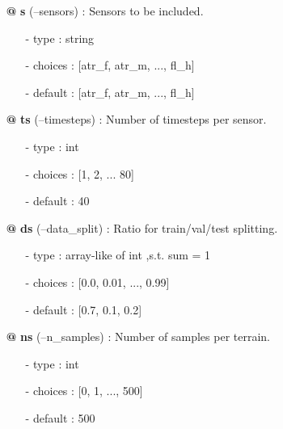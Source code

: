 {\begin{minipage}{\textwidth}
\begin{tcolorbox}[boxsep=0pt,top=10pt,left=10pt,right=10pt, bottom=10pt, arc=0pt, auto outer arc, colback=white, colframe=lightgray]
\begin{itemize}
\item[\textbf{@}] \textbf{s} (--sensors) : Sensors to be included.
\begin{itemize}
\item[-] type    \hspace{15pt}	: string 
\item[-] choices \hspace{4pt} 	: [atr\_f, atr\_m, ..., fl\_h]
\item[-] default \hspace{4pt} 	: [atr\_f, atr\_m, ..., fl\_h] 
\end{itemize}
\item[\textbf{@}] \textbf{ts} (--timesteps) : Number of timesteps per sensor.
\begin{itemize}
\item[-] type    \hspace{15pt}	: int 
\item[-] choices \hspace{4pt} 	: [1, 2, ... 80]
\item[-] default \hspace{4pt} 	: 40
\end{itemize}
\item[\textbf{@}] \textbf{ds} (--data\_split) : Ratio for train/val/test splitting.
\begin{itemize}
\item[-] type    \hspace{15pt}	: array-like of int ,s.t. sum = 1 
\item[-] choices \hspace{4pt} 	: [0.0, 0.01, ..., 0.99]
\item[-] default \hspace{4pt} 	: [0.7, 0.1, 0.2]
\end{itemize}
\item[\textbf{@}] \textbf{ns} (--n\_samples) : Number of samples per terrain.
\begin{itemize}
\item[-] type    \hspace{15pt}	: int 
\item[-] choices \hspace{4pt} 	: [0, 1, ..., 500]
\item[-] default \hspace{4pt} 	: 500
\end{itemize}
\end{itemize}
\normalsize
\end{tcolorbox}
\end{minipage}}

